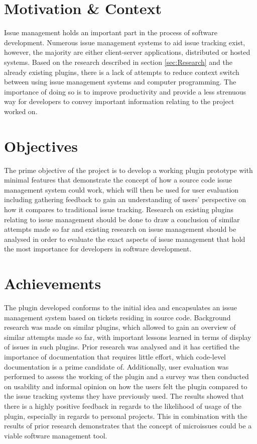 \documentclass{4thYearProject}
\begin{document}
\section{Motivation \& Context}

Issue management holds an important part in the process of software development. Numerous issue management systems to aid issue tracking exist, however, the majority are either client-server applications, distributed or hosted systems. Based on the research described in section \ref{sec:Research} and the already existing plugins, there is a lack of attempts to reduce context switch between using issue management systems and computer programming. The importance of doing so is to improve productivity and provide a less strenuous way for developers to convey important information relating to the project worked on.

\section{Objectives}

The prime objective of the project is to develop a working plugin prototype with minimal features that demonstrate the concept of how a source code issue management system could work, which will then be used for user evaluation including gathering feedback to gain an understanding of users' perspective on how it compares to traditional issue tracking. Research on existing plugins relating to issue management should be done to draw a conclusion of similar attempts made so far and existing research on issue management should be analysed in order to evaluate the exact aspects of issue management that hold the most importance for developers in software development. 

\section{Achievements}

The plugin developed conforms to the initial idea and encapsulates an issue management system based on tickets residing in source code. Background research was made on similar plugins, which allowed to gain an overview of similar attempts made so far, with important lessons learned in terms of display of issues in such plugins. Prior research was analysed and it has certified the importance of documentation that requires little effort, which code-level documentation is a prime candidate of. Additionally, user evaluation was performed to assess the working of the plugin and a survey was then conducted on usability and informal opinion on how the users felt the plugin compared to the issue tracking systems they have previously used. The results showed that there is a highly positive feedback in regards to the likelihood of usage of the plugin, especially in regards to personal projects. This in combination with the results of prior research demonstrates that the concept of microissues could be a viable software management tool.
\end{document}
